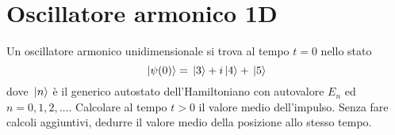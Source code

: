 \chapter{Oscillatore armonico 1D}

\begin{esercizio}[(07/10/2020 n°2)]
   Un oscillatore armonico unidimensionale si trova al tempo $t=0$ nello stato
   \begin{equation*}
      \ket*{\psi(0)}=\ket*{3} + i\ket*{4} + \ket*{5}
   \end{equation*}
   dove $\ket*{n}$ è il generico autostato dell'Hamiltoniano con autovalore $E_n$ ed $n=0,1,2,\ldots$. Calcolare al tempo $t>0$ il valore medio dell'impulso. Senza fare calcoli aggiuntivi, dedurre il valore medio della posizione allo stesso tempo.
\end{esercizio}
